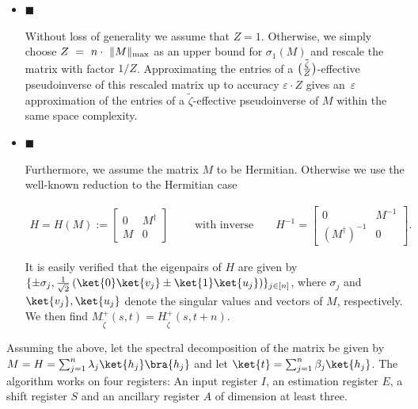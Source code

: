 \begin{itemize}


\item[] 
$\blacksquare$ 


Without loss of generality we assume that $Z=1$. Otherwise, we simply choose $Z\nobreak\ =\nobreak\ n\cdot\nobreak\ \|M\|_{\max}$ as an upper bound for $\sigma_{1}(M)$ and rescale the matrix with factor $1/Z$.
Approximating the entries of a $\tilde{\big{(}\frac{\zeta}{Z}\big{)}}$-effective pseudoinverse of this rescaled matrix up to accuracy $\varepsilon\cdot Z$ gives an $\varepsilon$ approximation of the entries of a $\tilde{\zeta}$-effective pseudoinverse of $M$ within the same space complexity.\par





\item[] 
$\blacksquare$ 


Furthermore, we assume the matrix $M$ to be Hermitian. Otherwise we use the well-known reduction to the Hermitian case\par


\[\begin{gathered}
\displaystyle H=H(M):=\begin{bmatrix}0&M^{{\dagger}}\\
M&0\end{bmatrix}\qquad\text{ with inverse}\qquad H^{-1}=\begin{bmatrix}0&M^{-1}\\
(M^{\dagger})^{-1}&0\end{bmatrix}.
\end{gathered}\]


It is easily verified that the eigenpairs of $H$ are given by $\{\pm\sigma_{j},\frac{1}{\sqrt{2}}\left(\ket{0}\ket{v_{j}}\pm\ket{1}\ket{u_{j}}\right)\}_{j\in[n]}$, where $\sigma_{j}$ and $\ket{v_{j}},\ket{u_{j}}$ denote the singular values and vectors of $M$, respectively. We then find $M^{+}_{\widetilde{\zeta}}(s,t)=H^{+}_{\widetilde{\zeta}}(s,t+n)$.\par





\end{itemize}


Assuming the above, let the spectral decomposition of the matrix be given by $M=H=\sum_{j=1}^{n}\lambda_{j}\ket{h_{j}}\bra{h_{j}}$ and let $\ket{t}=\sum_{j=1}^{n}\beta_{j}\ket{h_{j}}$.
The algorithm works on four registers: An input register $I$, an estimation register $E$, a shift register $S$ and an ancillary register $A$ of dimension at least three.\par


